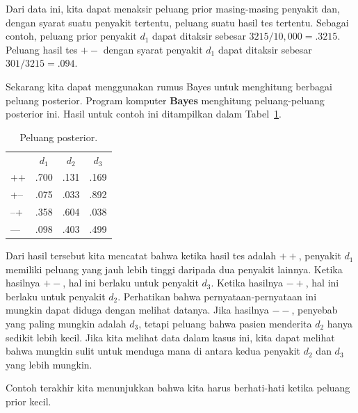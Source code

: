 \begin{example}
Dari data ini, kita dapat menaksir peluang prior masing-masing
penyakit dan, dengan syarat suatu penyakit tertentu, peluang suatu hasil tes
tertentu.  Sebagai contoh, peluang prior penyakit $d_1$ dapat ditaksir
sebesar $3215/10{,}000 = .3215$.  Peluang hasil tes $+{}-$ dengan syarat
penyakit $d_1$ dapat ditaksir sebesar $301/3215 = .094$.
\par
Sekarang kita dapat menggunakan rumus Bayes untuk menghitung berbagai peluang posterior.  Program
komputer {\bf Bayes} menghitung peluang-peluang posterior ini.  Hasil
untuk contoh ini ditampilkan dalam Tabel~\ref{table 4.35}.


\begin{table}
\centering
\begin{tabular}{lccc}
                                    &  $d_1$ &  $d_2$ &  $d_3$  \\
+\hspace{.1in}+                     & .700   & .131   & .169    \\
+\hspace{.125in}--                    & .075   & .033   & .892    \\
\hspace{.025in}--\hspace{.125in}+     &
.358   & .604   & .038    \\
\hspace{.025in}--\hspace{.15in}--  &
.098   & .403   & .499    \\
\end{tabular}
\caption{Peluang posterior.}
\label{table 4.35}
\end{table}
Dari hasil tersebut kita mencatat bahwa ketika hasil tes adalah $++$, penyakit $d_1$
memiliki peluang yang jauh lebih tinggi daripada dua penyakit lainnya.  Ketika hasilnya $+-$,
hal ini berlaku untuk penyakit $d_3$.  Ketika hasilnya $-+$, hal ini berlaku untuk penyakit $d_2$.
Perhatikan bahwa pernyataan-pernyataan ini mungkin dapat diduga dengan melihat datanya. Jika hasilnya $--$, 
penyebab yang paling mungkin adalah $d_3$, tetapi peluang bahwa pasien menderita $d_2$ hanya sedikit lebih kecil.
Jika kita melihat data dalam kasus ini, kita dapat melihat bahwa mungkin sulit untuk menduga mana di antara kedua
penyakit $d_2$ dan $d_3$ yang lebih mungkin.
\end{example}
  
Contoh terakhir kita menunjukkan bahwa kita harus berhati-hati ketika peluang prior
kecil.

